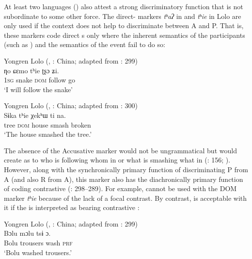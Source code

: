 \documentclass[output=paper]{langsci/langscibook}
\begin{document}
At least two  languages () also attest a strong discriminatory function that is not subordinate to some other force. The direct- markers \textit{tʰ}\textit{aʔ} in  and \textit{tʰ}\textit{ie} in Lolo are only used if the context does not help to discriminate between A and P. That is, these markers code direct s only where the inherent semantics of the participants (such as ) and the semantics of the event fail to do so:

\ea\label{ex:serzant:25}
Yongren Lolo (, : China; adapted from \citealt{Gerner2008}: 299{\footnotemark})\\
\gll ƞo   ɕεmo   tʰie   ʈʂɔ   ʑi.\\
     1\textsc{sg}  snake  \textsc{dom}  follow  go\\
\glt ‘I will follow the snake’
\z

\ea\label{ex:serzant:26}
Yongren Lolo (, : China; adapted from \citealt{Gerner2008}: 300)\\
\gll Sɨka   tʰie   χekʰɯ   ti   na.\\
     tree  \textsc{dom}  house  smash  broken\\
\glt ‘The house smashed the tree.’
\z

\noindent The absence of the Accusative marker would not be ungrammatical but would create  as to who is following whom in  or what is smashing what in  (\citealt{Matisoff1973}: 156; \citealt{Gerner2008}). However, along with the synchronically primary function of discriminating P from A (and also R from A), this marker also has the diachronically primary function of coding contrastive  (\citealt{Gerner2008}: 298–289). For example,  cannot be used with the DOM marker \textit{tʰ}\textit{ie} because of the lack of a focal contrast. By contrast,  is acceptable with it if the  is interpreted as bearing contrastive  \citep[299]{Gerner2008}:

\ea\label{ex:serzant:27}
Yongren Lolo (, : China; adapted from \citealt{Gerner2008}: 299)\\
\ea\label{ex:serzant:27a}
\gll Bɔlu   mɔlu     tsɨ   ɔ.\\
     Bolu  trousers  wash  \textsc{prf}\\
\glt ‘Bolu washed trousers.’
\end{document}
